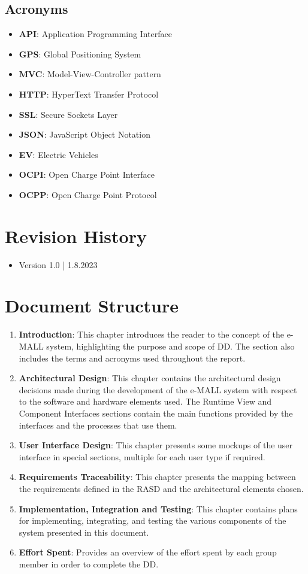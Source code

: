 \documentclass[12pt]{report}
\begin{document}
\subsection{Acronyms}
\begin{itemize}
    \item\textbf{API}: Application Programming Interface 
    \item\textbf{GPS}: Global Positioning System
    \item\textbf{MVC}: Model-View-Controller pattern
    \item\textbf{HTTP}: HyperText Transfer Protocol
    \item\textbf{SSL}: Secure Sockets Layer
    \item\textbf{JSON}: JavaScript Object Notation
    \item\textbf{EV}: Electric Vehicles
    \item\textbf{OCPI}: Open Charge Point Interface
    \item\textbf{OCPP}: Open Charge Point Protocol
\end{itemize}

\section{Revision History}
    \begin{itemize}
        \item Version 1.0 | 1.8.2023
    \end{itemize}

\section{Document Structure}
\begin{enumerate}
    \item\textbf{Introduction}: This chapter introduces the reader to the concept of the e-MALL system, highlighting the purpose and scope of DD. The section also includes the terms and acronyms used throughout the report.
    \item\textbf{Architectural Design}: This chapter contains the architectural design decisions made during the development of the e-MALL system with respect to the software and hardware elements used. The Runtime View and Component Interfaces sections contain the main functions provided by the interfaces and the processes that use them.
    \item\textbf{User Interface Design}: This chapter presents some mockups of the user interface in special sections, multiple for each user type if required.
    \item\textbf{Requirements Traceability}: This chapter presents the mapping between the requirements defined in the RASD and the architectural elements chosen.
    \item\textbf{Implementation, Integration and Testing}: This chapter contains plans for implementing, integrating, and testing the various components of the system presented in this document.
    \item\textbf{Effort Spent}: Provides an overview of the effort spent by each group member in order to complete the DD.
\end{enumerate}
\end{document}
